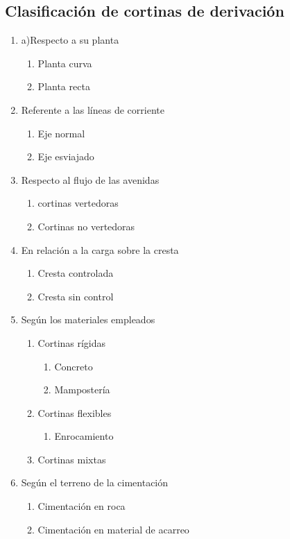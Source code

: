 \subsection{Clasificación de cortinas de derivación}

\begin{enumerate}
	\item a)Respecto a su planta
	      \begin{enumerate}
		      \item Planta curva
		      \item Planta recta
	      \end{enumerate}
	\item Referente a las líneas de corriente
	      \begin{enumerate}
		      \item  Eje normal
		      \item  Eje esviajado
	      \end{enumerate}
	\item Respecto al flujo de las avenidas
	      \begin{enumerate}
		      \item cortinas vertedoras
		      \item Cortinas no vertedoras
	      \end{enumerate}
	\item En relación a la carga sobre la cresta
	      \begin{enumerate}
		      \item Cresta controlada
		      \item Cresta sin control
	      \end{enumerate}
	\item Según los materiales empleados
	      \begin{enumerate}
		      \item Cortinas rígidas
		            \begin{enumerate}
			            \item Concreto
			            \item Mampostería
		            \end{enumerate}
		      \item Cortinas flexibles
		            \begin{enumerate}
			            \item Enrocamiento
		            \end{enumerate}
		      \item Cortinas mixtas
	      \end{enumerate}
	\item Según el terreno de la cimentación
	      \begin{enumerate}
		      \item Cimentación en roca
		      \item Cimentación en material de acarreo
	      \end{enumerate}
\end{enumerate}

